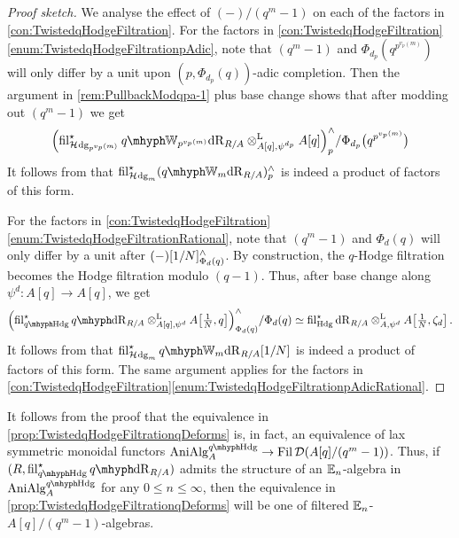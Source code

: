 \documentclass[DIV=12,numbers=enddot,leqno,bibliography=totoc]{scrartcl}
\begin{document}
	\begin{proof}[Proof sketch]
		We analyse the effect of $(-)/(q^m-1)$ on each of the factors in \cref{con:TwistedqHodgeFiltration}. For the factors in \cref{con:TwistedqHodgeFiltration}\cref{enum:TwistedqHodgeFiltrationpAdic}, note that $(q^m-1)$ and $\Phi_{d_p}(q^{p^{v_p(m)}})$ will only differ by a unit upon $(p,\Phi_{d_p}(q))$-adic completion. Then the argument in \cref{rem:PullbackModqpa-1} plus base change shows that after modding out $(q^m-1)$ we get
		\begin{equation*}
			\left( \fil_{\Hhodge_{p^{\smash{v_p(m)}}}}^\star \qIW_{p^{\smash{v_p(m)}}}\deRham_{R/A}\lotimes_{A[q],\psi^{d_p}}A[q]\right)_p^\complete/\Phi_{d_p}\bigl(q^{p^{v_p(m)}}\bigr)
		\end{equation*}
		It follows from \cite[Lemma~]{qWitt} that $ \fil_{\Hhodge_m}^\star (\qIW_m\deRham_{R/A})_p^\complete$ is indeed a product of factors of this form.
		
		For the factors in \cref{con:TwistedqHodgeFiltration}\cref{enum:TwistedqHodgeFiltrationRational}, note that $(q^m-1)$ and $\Phi_d(q)$ will only differ by a unit after $(-)[1/N]_{\Phi_d(q)}^\wedge$. By construction, the $q$-Hodge filtration becomes the Hodge filtration modulo $(q-1)$. Thus, after base change along $\psi^d\colon A[q]\rightarrow A[q]$, we get
		\begin{equation*}
			\left(\fil_{\qHodge}^\star \qdeRham_{R/A}\lotimes_{A[q],\psi^d}A\bigl[\localise{N},q\bigr]\right)_{\Phi_d(q)}^\complete/\Phi_d(q)\simeq \fil_{\Hodge}^\star \deRham_{R/A}\lotimes_{A,\psi^d}A\bigl[\localise{N},\zeta_d\bigr]\,.
		\end{equation*}
		It follows from \cite[Corollary~]{qWitt} that $ \fil_{\Hhodge_m}^\star \qIW_m\deRham_{R/A}[1/N]$ is indeed a product of factors of this form. The same argument applies for the factors in \cref{con:TwistedqHodgeFiltration}\cref{enum:TwistedqHodgeFiltrationpAdicRational}.
	\end{proof}
	\begin{rem}
		It follows from the proof that the equivalence in \cref{prop:TwistedqHodgeFiltrationqDeforms} is, in fact, an equivalence of lax symmetric monoidal functors $\cat{AniAlg}_A^{\qHodge}\rightarrow  \Fil\Dd(A[q]/(q^m-1))$. Thus, if $(R, \fil_{\qHodge}^\star \qdeRham_{R/A})$ admits the structure of an $\mathbb{E}_n$-algebra in $\cat{AniAlg}_A^{\qHodge}$ for any $0\leqslant n\leqslant\infty$, then the equivalence in \cref{prop:TwistedqHodgeFiltrationqDeforms} will be one of filtered $\mathbb{E}_n$-$A[q]/(q^m-1)$-algebras.
	\end{rem}
\end{document}
